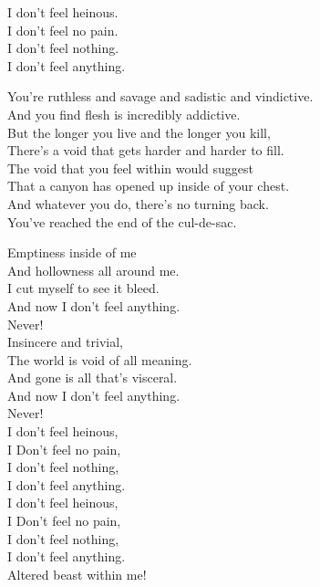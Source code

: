 I don't feel heinous. \\
I don't feel no pain. \\
I don't feel nothing. \\
I don't feel anything. \\


You're ruthless and savage and sadistic and vindictive. \\
And you find  flesh is incredibly addictive. \\

But the longer you live and the longer you kill, \\
There's a void that gets harder and harder to fill. \\

The void that you feel within would suggest \\
That a canyon has opened up inside of your chest. \\

And whatever you do, there's no turning back. \\
You've reached the end of the cul-de-sac. \\


Emptiness inside of me \\
And hollowness all around me. \\
I cut myself to see it bleed. \\
And now I don't feel anything. \\
Never! \\

Insincere and trivial, \\
The world is void of all meaning. \\
And gone is all that's visceral. \\
And now I don't feel anything. \\
Never! \\

I don't feel heinous, \\
I Don't feel no pain, \\
I don't feel nothing, \\
I don't feel anything. \\
I don't feel heinous, \\
I Don't feel no pain, \\
I don't feel nothing, \\
I don't feel anything. \\
Altered beast within me! \\

